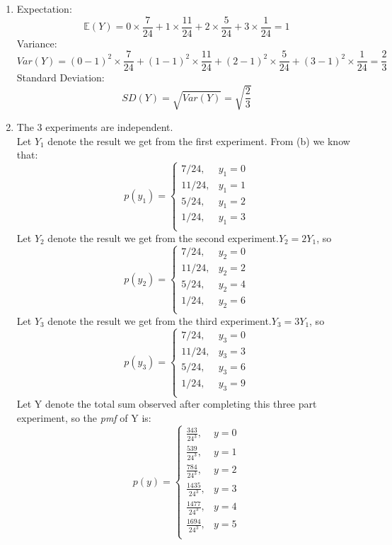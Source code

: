 \documentclass[11pt]{article}
\begin{document}
\begin{enumerate}[label=\textbf{Question \arabic*:},start=1]
\begin{enumerate}
\item Expectation:
\[
\mathbb{E}(Y) = 0 \times \frac{7}{24} + 1 \times \frac{11}{24} + 2 \times \frac{5}{24} + 3 \times \frac{1}{24} = 1
\]
Variance:
\[
Var(Y) = (0 - 1)^2 \times \frac{7}{24} + (1 - 1)^2 \times \frac{11}{24} + (2 - 1)^2 \times \frac{5}{24} + (3 - 1)^2 \times \frac{1}{24} = \frac{2}{3}
\]
Standard Deviation:
\[
SD(Y) = \sqrt{Var(Y)} = \sqrt{\frac{2}{3}}
\]


\item The 3 experiments are independent.\\
Let \(Y_1\) denote the result we get from the first experiment. From (b) we know that:
\[
    p(y_1) = \begin{cases}
        7/24, & y_1 = 0\\
        11/24, & y_1 = 1\\
        5/24, & y_1 = 2\\
        1/24 , & y_1 = 3\\
        \end{cases}
\]
Let \(Y_2\) denote the result we get from the second experiment.\(Y_2 = 2 Y_1\), so
\[
    p(y_2) = \begin{cases}
        7/24, & y_2 = 0\\
        11/24, & y_2 = 2\\
        5/24, & y_2 = 4\\
        1/24 , & y_2 = 6\\
        \end{cases}
\]
Let \(Y_3\) denote the result we get from the third experiment.\(Y_3 = 3 Y_1\), so
\[
    p(y_3) = \begin{cases}
        7/24, & y_3 = 0\\
        11/24, & y_3 = 3\\
        5/24, & y_3 = 6\\
        1/24 , & y_3 = 9\\
        \end{cases}
\]
Let Y denote the total sum observed after completing this three part experiment, so the \textit{pmf} of Y is:
\[
    p(y) = \begin{cases}
        \frac{343}{24^3}, & y = 0\\
        \frac{539}{24^3}, & y = 1\\
        \frac{784}{24^3}, & y = 2\\
        \frac{1435}{24^3} , & y = 3\\
        \frac{1477}{24^3}, & y = 4\\
        \frac{1694}{24^3}, & y = 5\\

\end{cases}\]
\end{enumerate}
\end{enumerate}
\end{document}
